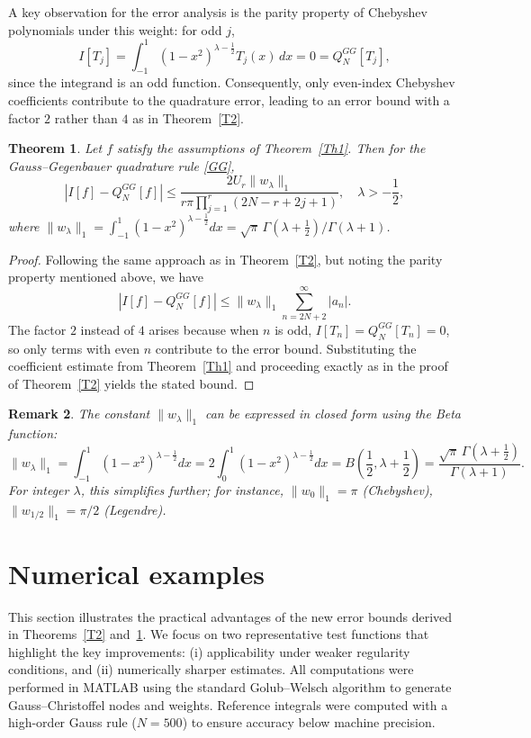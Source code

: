 \documentclass[12pt,a4paper]{article}
\newtheorem{theorem}{Theorem}[section]
\newtheorem{remark}[theorem]{Remark}
\begin{document}
A key observation for the error analysis is the parity property of Chebyshev polynomials under this weight: for odd $j$,
\[
I[T_j] = \int_{-1}^{1} (1-x^2)^{\lambda-\frac{1}{2}} T_j(x)\,dx = 0 = Q_N^{GG}[T_j],
\]
since the integrand is an odd function. Consequently, only even-index Chebyshev coefficients contribute to the quadrature error, leading to an error bound with a factor $2$ rather than $4$ as in Theorem~\ref{T2}.

\begin{theorem}\label{T3}
    Let $f$ satisfy the assumptions of Theorem~\ref{Th1}. Then for the Gauss--Gegenbauer quadrature rule \eqref{GG},
    \[
    \left| I[f] - Q_N^{GG}[f] \right| \leq \frac{2U_r \|w_\lambda\|_1}{r\pi \prod_{j=1}^{r}(2N - r + 2j + 1)}, \quad \lambda > -\frac{1}{2},
    \]
    where $\|w_\lambda\|_1 = \int_{-1}^{1} (1-x^2)^{\lambda-\frac{1}{2}} dx = \sqrt{\pi}\, \Gamma(\lambda+\frac{1}{2})/\Gamma(\lambda+1)$.
\end{theorem}

\begin{proof}
    Following the same approach as in Theorem~\ref{T2}, but noting the parity property mentioned above, we have
    \[
    \left| I[f] - Q_N^{GG}[f] \right| \leq \|w_\lambda\|_1 \sum_{n=2N+2}^{\infty} |a_n|.
    \]
    The factor $2$ instead of $4$ arises because when $n$ is odd, $I[T_n] = Q_N^{GG}[T_n] = 0$, so only terms with even $n$ contribute to the error bound. Substituting the coefficient estimate from Theorem~\ref{Th1} and proceeding exactly as in the proof of Theorem~\ref{T2} yields the stated bound.
\end{proof}

\begin{remark}
    The constant $\|w_\lambda\|_1$ can be expressed in closed form using the Beta function:
    \[
    \|w_\lambda\|_1 = \int_{-1}^{1} (1-x^2)^{\lambda-\frac{1}{2}} dx 
    = 2\int_{0}^{1} (1-x^2)^{\lambda-\frac{1}{2}} dx 
    = B\left(\frac{1}{2}, \lambda+\frac{1}{2}\right)
    = \frac{\sqrt{\pi}\, \Gamma(\lambda+\frac{1}{2})}{\Gamma(\lambda+1)}.
    \]
    For integer $\lambda$, this simplifies further; for instance, $\|w_0\|_1 = \pi$ (Chebyshev), $\|w_{1/2}\|_1 = \pi/2$ (Legendre).
\end{remark}

\section{Numerical examples}\label{sec:numerics}

This section illustrates the practical advantages of the new error bounds derived in Theorems~\ref{T2} and~\ref{T3}. We focus on two representative test functions that highlight the key improvements: (i) applicability under weaker regularity conditions, and (ii) numerically sharper estimates. All computations were performed in MATLAB using the standard Golub--Welsch algorithm to generate Gauss--Christoffel nodes and weights. Reference integrals were computed with a high-order Gauss rule ($N=500$) to ensure accuracy below machine precision.
\end{document}

